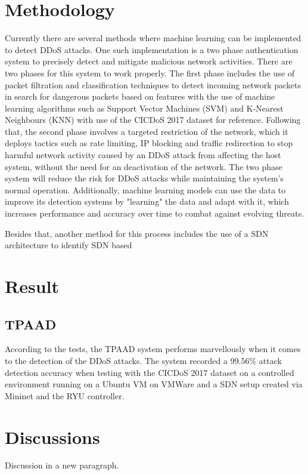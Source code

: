 \documentclass[a4paper, 12pt]{article}
\begin{document}
\section{Methodology}

Currently there are several methods where machine learning can be implemented to detect DDoS attacks. One such implementation is a two phase authentication system to precisely detect and mitigate malicious network activities. There are two phases for this system to work properly. The first phase includes the use of packet filtration and classification techniques to detect incoming network packets in search for dangerous packets based on features with the use of machine learning algorithms such as Support Vector Machines (SVM) and K-Nearest Neighbours (KNN) with use of the CICDoS 2017 dataset for reference. Following that, the second phase involves a targeted restriction of the network, which it deploys tactics such as rate limiting, IP blocking and traffic redirection to stop harmful network activity caused by an DDoS attack from affecting the host system, without the need for an deactivation of the network. The two phase system will reduce the risk for DDoS attacks while maintaining the system's normal operation. Additionally, machine learning models can use the data to improve its detection systems by "learning" the data and adapt with it, which increases performance and accuracy over time to combat against evolving threats. 

\cite{3} 

Besides that, another method for this process includes the use of a SDN architecture to identify SDN based \cite{5} 

\section{Result}

\subsection{TPAAD}
According to the tests, the TPAAD system performs marvellously when it comes to the detection of the DDoS attacks. The system recorded a 99.56\% attack detection accuracy when testing with the CICDoS 2017 dataset on a controlled environment running on a Ubuntu VM on VMWare and a SDN setup created via Mininet and the RYU controller. \cite{3}

\section{Discussions}
Discussion in a new paragraph.
\end{document}
